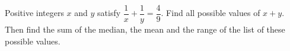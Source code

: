 Positive integers $x$ and $y$ satisfy $\dfrac{1}{x}+\dfrac{1}{y}=\dfrac{4}{9}$. Find all possible values of $x+y$. Then find the sum of the median, the mean and the range of the list of these possible values.
